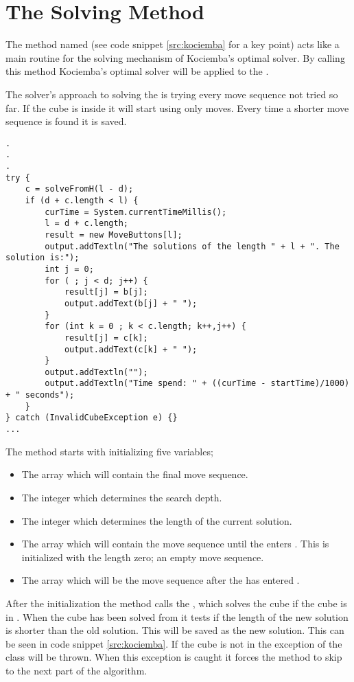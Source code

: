 \section{The Solving Method}
\label{sec:kSolve}
The method named  (see code snippet \ref{src:kociemba} for a key point) acts like a main routine for the solving mechanism of Kociemba's optimal solver. By calling this method Kociemba's optimal solver will be applied to the \rubik{}. 

The solver's approach to solving the \rubik{} is trying every move sequence not tried so far. If the cube is inside  it will start using only  moves. Every time a shorter move sequence is found it is saved. 

\begin{lstlisting}[style=sourceCode, caption=\myCaption{Key point in the solve method of Kociemba's optimal solver}, label=src:kociemba]
.
.
.
try {
	c = solveFromH(l - d);
	if (d + c.length < l) {
		curTime = System.currentTimeMillis();
		l = d + c.length;
		result = new MoveButtons[l];
		output.addTextln("The solutions of the length " + l + ". The solution is:");
		int j = 0;
		for ( ; j < d; j++) {
			result[j] = b[j];
			output.addText(b[j] + " ");
		}
		for (int k = 0 ; k < c.length; k++,j++) {
			result[j] = c[k];
			output.addText(c[k] + " ");
		}
		output.addTextln("");
		output.addTextln("Time spend: " + ((curTime - startTime)/1000) + " seconds");
	}
} catch (InvalidCubeException e) {}
...
\end{lstlisting}

The  method starts with initializing five variables; 
\begin{itemize}
\item The array  which will contain the final move sequence.
\item The integer  which determines the search depth. 
\item The integer  which determines the length of the current solution. 
\item The array  which will contain the move sequence until the \rubik{} enters . This is initialized with the length zero; an empty move sequence. 
\item The array  which will be the move sequence after the \rubik{} has entered .
\end{itemize}

After the initialization the  method calls the , which solves the cube if the cube is in . 
When the cube has been solved from  it tests if the length of the new solution is shorter than the old solution. 
This will be saved as the new solution. 
This can be seen in code snippet \ref{src:kociemba}.
If the cube is not in   the exception of the class  will be thrown.
When this exception is caught it forces the  method to skip to the next part of the algorithm. 

